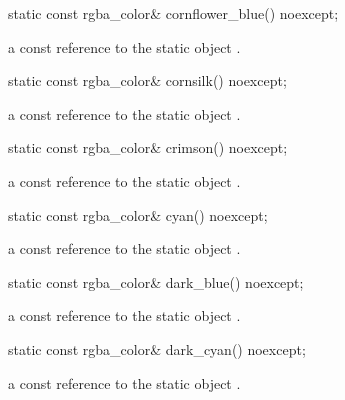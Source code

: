 \begin{itemdecl}
static const rgba_color& cornflower_blue() noexcept;
\end{itemdecl}
\begin{itemdescr}
\pnum
\returns
a const reference to the static  object .
\end{itemdescr}

\begin{itemdecl}
static const rgba_color& cornsilk() noexcept;
\end{itemdecl}
\begin{itemdescr}
\pnum
\returns
a const reference to the static  object .
\end{itemdescr}

\begin{itemdecl}
static const rgba_color& crimson() noexcept;
\end{itemdecl}
\begin{itemdescr}
\pnum
\returns
a const reference to the static  object .
\end{itemdescr}

\begin{itemdecl}
static const rgba_color& cyan() noexcept;
\end{itemdecl}
\begin{itemdescr}
\pnum
\returns
a const reference to the static  object .
\end{itemdescr}

\begin{itemdecl}
static const rgba_color& dark_blue() noexcept;
\end{itemdecl}
\begin{itemdescr}
\pnum
\returns
a const reference to the static  object .
\end{itemdescr}

\begin{itemdecl}
static const rgba_color& dark_cyan() noexcept;
\end{itemdecl}
\begin{itemdescr}
\pnum
\returns
a const reference to the static  object .
\end{itemdescr}

